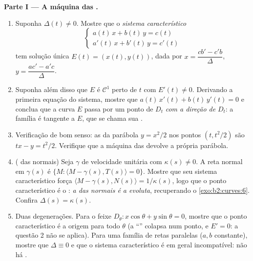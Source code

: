 \begin{problem}
\medskip
\noindent\textbf{Parte I --- A máquina das .}
\begin{enumerate}
  \item Suponha $\Delta(t) \neq 0$. Mostre que o
        \emph{sistema característico}
        \[
        \begin{cases} a(t)\,x + b(t)\,y = c(t)\\
        a'(t)\,x + b'(t)\,y = c'(t)\end{cases}
        \]
        tem solução única $E(t) = (x(t), y(t))$, dada por
        $x = \dfrac{cb' - c'b}{\Delta}$, $y = \dfrac{ac' -
        a'c}{\Delta}$.
  \item Suponha além disso que $E$ é $\mathcal C^1$ perto de $t$
        com $E'(t) \neq 0$. Derivando a primeira
        equação do sistema, mostre que $a(t)\,x'(t) +
        b(t)\,y'(t) = 0$ e conclua que a curva $E$
        passa por um ponto de $D_t$ \emph{com a
        direção de} $D_t$: a família é tangente a $E$,
        que se chama sua \emph{}.
  \item Verificação de bom senso: as  da parábola $y =
        x^2/2$ nos pontos $(t, t^2/2)$ são $tx - y =
        t^2/2$. Verifique que a máquina das  devolve a
        própria parábola.
  \item ( das normais) Seja $\gamma$ de velocidade unitária
        com $\kappa(s) \neq 0$. A reta normal em
        $\gamma(s)$ é $\{M : \langle M - \gamma(s), T(s)
        \rangle = 0\}$. Mostre que seu sistema característico
        força $\langle M - \gamma(s), N(s)\rangle =
        1/\kappa(s)$, logo que o ponto característico é
        o : \emph{a  das
        normais é a evoluta}, recuperando o
        \cref{exo:b2:curves:6}. Confira $\Delta(s) =
        \kappa(s)$.
  \item Duas degenerações. Para o feixe $D_\theta : x\cos
        \theta + y\sin\theta = 0$, mostre que
        o ponto característico é a origem para todo $\theta$
        (a ``'' colapsa num ponto, e $E' = 0$:
        a questão 2 não se aplica). Para uma família de retas
        paralelas ($a, b$ constante), mostre que $\Delta \equiv 0$ e
        que o sistema característico é em geral
        incompatível: não há .
\end{enumerate}


\end{problem}
